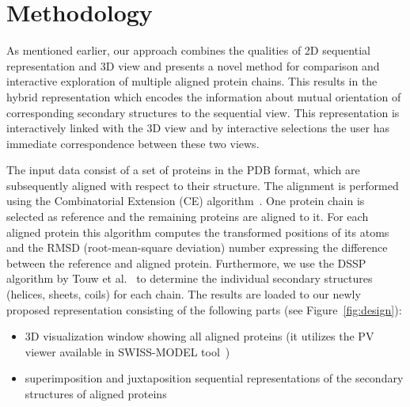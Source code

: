 \documentclass[twocolumn]{bmcart}%
\begin{document}
\section*{Methodology}
As mentioned earlier, our approach combines the qualities of 2D sequential representation and 3D view and presents a novel method for comparison and interactive exploration of multiple aligned protein chains.
This results in the hybrid representation which encodes the information about mutual orientation of corresponding secondary structures to the sequential view.
This representation is interactively linked with the 3D view and by interactive selections the user has immediate correspondence between these two views.

The input data consist of a set of proteins in the PDB format, which are subsequently aligned with respect to their structure.
The alignment is performed using the Combinatorial Extension (CE) algorithm~\cite{Shindyalov1998}. 
One protein chain is selected as reference and the remaining proteins are aligned to it.
For each aligned protein this algorithm computes the transformed positions of its atoms and the RMSD (root-mean-square deviation) number expressing the difference between the reference and aligned protein.  
Furthermore, we use the DSSP algorithm by Touw et al.~\cite{dssp} to determine the individual secondary structures (helices, sheets, coils) for each chain.
The results are loaded to our newly proposed representation consisting of the following parts (see Figure~\ref{fig:design}):
\begin{itemize}
\item 3D visualization window showing all aligned proteins (it utilizes the PV viewer available in SWISS-MODEL tool~\cite{biasini2014})
\item superimposition and juxtaposition sequential representations of the secondary structures of aligned proteins
\end{itemize}
\end{document}
